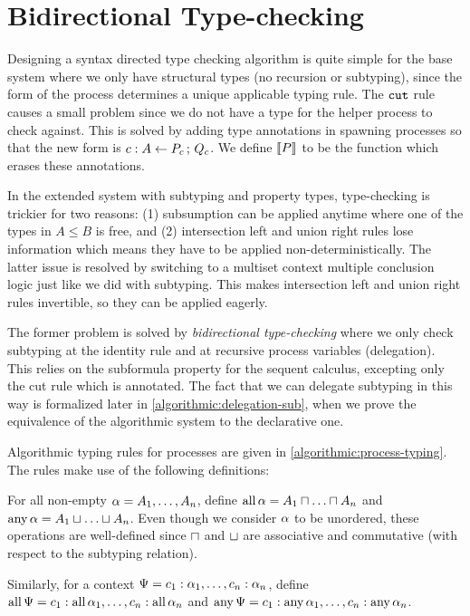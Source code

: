 
\section{Bidirectional Type-checking}

Designing a syntax directed type checking algorithm is quite simple for the base system where we only have structural types (no recursion or subtyping), since the form of the process determines a unique applicable typing rule. The $\cut$ rule causes a small problem since we do not have a type for the helper process to check against. This is solved by adding type annotations in spawning processes so that the new form is $\tspawnType c {P_c} A {Q_c}$. We define $\erase{P}$ to be the function which erases these annotations.

In the extended system with subtyping and property types, type-checking is trickier for two reasons: (1) subsumption can be applied anytime where one of the types in $A \le B$ is free, and (2) intersection left and union right rules lose information which means they have to be applied non-deterministically. The latter issue is resolved by switching to a multiset context multiple conclusion logic just like we did with subtyping. This makes intersection left and union right rules invertible, so they can be applied eagerly.

The former problem is solved by \emph{bidirectional type-checking} where we only check subtyping at the identity rule and at recursive process variables (delegation). This relies on the subformula property for the sequent calculus, excepting only the cut rule which is annotated. The fact that we can delegate subtyping in this way is formalized later in \cref{algorithmic:delegation-sub}, when we prove the equivalence of the algorithmic system to the declarative one. 

Algorithmic typing rules for processes are given in \cref{algorithmic:process-typing}. The rules make use of the following definitions:

\begin{definition}
  For all non-empty $\typeList = A_1, \ldots, A_n$, define $\all \typeList = A_1 \intersect \ldots \intersect A_n$ and $\any \typeList = A_1 \union \ldots \union A_n$. Even though we consider $\typeList$ to be unordered, these operations are well-defined since $\intersect$ and $\union$ are associative and commutative (with respect to the subtyping relation).

  Similarly, for a context $\ctx = c_1 : \typeList_1, \ldots, c_n : \typeList_n$, define $\all \ctx = c_1 : \all {\typeList_1}, \ldots, c_n : \all {\typeList_n}$ and $\any \ctx = c_1 : \any {\typeList_1}, \ldots, c_n : \any {\typeList_n}$.
\end{definition}

